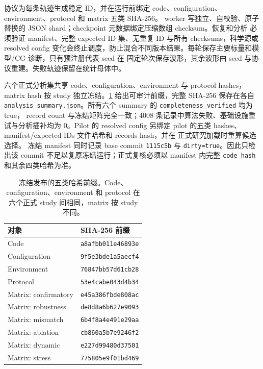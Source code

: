 \documentclass[UTF8,zihao=-4,a4paper]{ctexart}
\begin{document}
协议为每条轨迹生成稳定 ID，并在运行前绑定 code、configuration、environment、protocol 和 matrix
五类 SHA-256。
worker 写独立、自校验、原子替换的 JSON shard；checkpoint 元数据绑定压缩数组 checksum。恢复和分析
必须验证 manifest、完整 expected ID 集、无重复 ID 与所有 checksums，科学源或 resolved config
变化会终止调度，防止混合不同版本结果。每轮保存主要标量和模型/CG 诊断，只有预注册代表 seed 在
固定轮次保存波形，其余波形由 seed 与协议重建。失败轨迹保留在统计母体中。

六个正式分析集共享 code、configuration、environment 与 protocol hashes，matrix hash 按 study
独立冻结。\cref{tab:hashes} 给出可审计前缀，完整 SHA-256 保存在各自
\texttt{analysis\_summary.json}。所有六个 summary 的 \texttt{completeness\_verified} 均为 true，
record count 与冻结矩阵完全一致；4008 条记录中算法失败、基础设施重试与分析插补均为 0。Pilot 的
resolved config 另绑定 pilot 的五类 hashes、manifest/expected IDs 文件哈希和 records hash，并在
正式研究加载时重算候选选择。
冻结 manifest 同时记录 base commit \texttt{1115c5b} 与 \texttt{dirty=true}。因此只检出该 commit
不足以复原冻结运行；正式复核必须以 manifest 内完整 \texttt{code\_hash} 和其余四类哈希为准。

\begin{table}[t]
  \centering
  \caption{冻结发布的五类哈希前缀。Code、configuration、environment 和 protocol 在六个正式
  study 间相同，matrix 按 study 不同。}
  \label{tab:hashes}
  \begin{tabular}{ll}
    \toprule
    对象 & SHA-256 前缀 \\
    \midrule
    Code & \texttt{a8afbb011e46893e} \\
    Configuration & \texttt{9f5e3bde1a5aecf4} \\
    Environment & \texttt{76847bb57d61cb28} \\
    Protocol & \texttt{53e4cabe043d4b34} \\
    Matrix: confirmatory & \texttt{e45a386fbde808ac} \\
    Matrix: robustness & \texttt{de8d8a6b627e9093} \\
    Matrix: mismatch & \texttt{6b4f8a4e491e29aa} \\
    Matrix: ablation & \texttt{cb860a5b7e9246f2} \\
    Matrix: dynamic & \texttt{e227d99480d37501} \\
    Matrix: stress & \texttt{775805e9f01bd469} \\
    \bottomrule
  \end{tabular}
\end{table}
\end{document}
